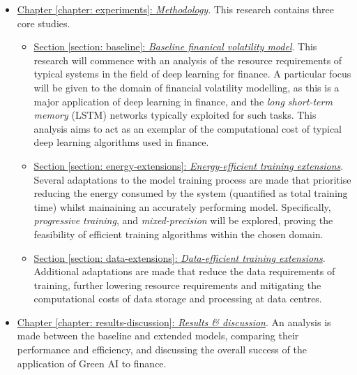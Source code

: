 \documentclass[a4paper, 11pt]{report}
\begin{document}
    \begin{itemize}
        \item \underline{Chapter \ref{chapter: experiments}: \emph{Methodology}}. This research contains three core studies.
        \begin{itemize}
            \item \underline{Section \ref{section: baseline}: \emph{Baseline finanical volatility model}}. This research will commence with an analysis of the resource requirements of typical systems in the field of deep learning for finance. A particular focus will be given to the domain of financial volatility modelling, as this is a major application of deep learning in finance, and the \emph{long short-term memory} (LSTM) networks typically exploited for such tasks. This analysis aims to act as an exemplar of the computational cost of typical deep learning algorithms used in finance.

            \item \underline{Section \ref{section: energy-extensions}: \emph{Energy-efficient training extensions}}. Several adaptations to the model training process are made that prioritise reducing the energy consumed by the system (quantified as total training time) whilst mainaining an accurately performing model. Specifically, \emph{progressive training}, and \emph{mixed-precision} will be explored, proving the feasibility of efficient training algorithms within the chosen domain.
            
            \item \underline{Section \ref{section: data-extensions}: \emph{Data-efficient training extensions}}. Additional adaptations are made that reduce the data requirements of training, further lowering resource requirements and mitigating the computational costs of data storage and processing at data centres.
        \end{itemize}
        
        \item \underline{Chapter \ref{chapter: results-discussion}: \emph{Results \& discussion}}. An analysis is made between the baseline and extended models, comparing their performance and efficiency, and discussing the overall success of the application of Green AI to finance.
    \end{itemize}
\end{document}
